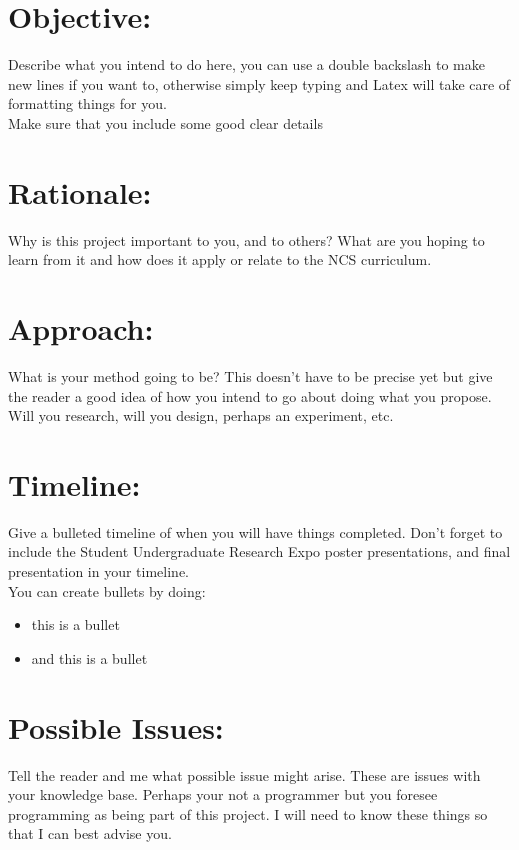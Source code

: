 \documentclass{article}
\begin{document}
    \begin{normalsize}
    
    	\section{Objective:}
        
        Describe what you intend to do here, you can use a double backslash to make new lines if you want to, otherwise simply keep typing and Latex will take care of formatting things for you. \\
        
        \noindent Make sure that you include some good clear details

		\section{Rationale:}
        
        Why is this project important to you, and to others? What are you hoping to learn from it and how does it apply or relate to the NCS curriculum. 
        
	   	\section{Approach:}
        
        What is your method going to be? This doesn't have to be precise yet but give the reader a good idea of how you intend to go about doing what you propose. Will you research, will you design, perhaps an experiment, etc. 
        
    	\section{Timeline:}
        
        Give a bulleted timeline of when you will have things completed. Don't forget to include the Student Undergraduate Research Expo poster presentations, and final presentation in your timeline. \\
        
        \noindent You can create bullets by doing:
        
        \begin{itemize}
        	\item this is a bullet
            \item and this is a bullet
        \end{itemize}
        
    	\section{Possible Issues:}
        
        Tell the reader and me what possible issue might arise. These are issues with your knowledge base. Perhaps your not a programmer but you foresee programming as being part of this project. I will need to know these things so that I can best advise you.

\end{normalsize}
  
\end{document}
